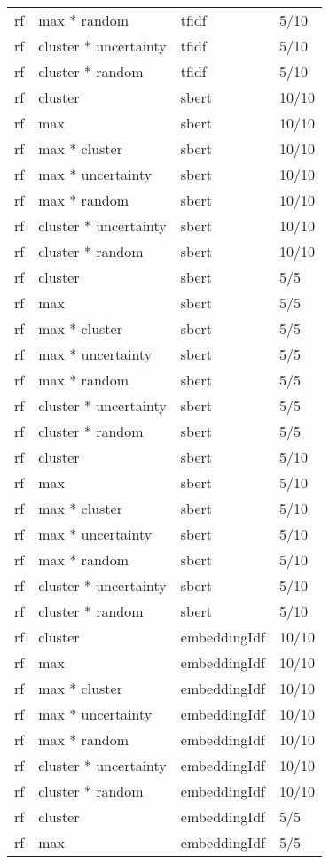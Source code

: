 \documentclass[12pt,twoside]{reedthesis}
\begin{document}
\begin{longtable}{llll}
rf & max * random & tfidf & 5/10\\
rf & cluster * uncertainty & tfidf & 5/10\\
rf & cluster * random & tfidf & 5/10\\
rf & cluster & sbert & 10/10\\
rf & max & sbert & 10/10\\
\addlinespace
rf & max * cluster & sbert & 10/10\\
rf & max * uncertainty & sbert & 10/10\\
rf & max * random & sbert & 10/10\\
rf & cluster * uncertainty & sbert & 10/10\\
rf & cluster * random & sbert & 10/10\\
\addlinespace
rf & cluster & sbert & 5/5\\
rf & max & sbert & 5/5\\
rf & max * cluster & sbert & 5/5\\
rf & max * uncertainty & sbert & 5/5\\
rf & max * random & sbert & 5/5\\
\addlinespace
rf & cluster * uncertainty & sbert & 5/5\\
rf & cluster * random & sbert & 5/5\\
rf & cluster & sbert & 5/10\\
rf & max & sbert & 5/10\\
rf & max * cluster & sbert & 5/10\\
\addlinespace
rf & max * uncertainty & sbert & 5/10\\
rf & max * random & sbert & 5/10\\
rf & cluster * uncertainty & sbert & 5/10\\
rf & cluster * random & sbert & 5/10\\
rf & cluster & embeddingIdf & 10/10\\
\addlinespace
rf & max & embeddingIdf & 10/10\\
rf & max * cluster & embeddingIdf & 10/10\\
rf & max * uncertainty & embeddingIdf & 10/10\\
rf & max * random & embeddingIdf & 10/10\\
rf & cluster * uncertainty & embeddingIdf & 10/10\\
\addlinespace
rf & cluster * random & embeddingIdf & 10/10\\
rf & cluster & embeddingIdf & 5/5\\
rf & max & embeddingIdf & 5/5\\

\end{longtable}
\end{document}
